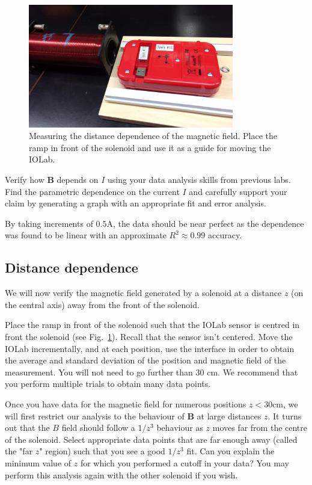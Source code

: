 \documentclass[12pt]{report}
\begin{document}
\begin{figure}[h]
\centering
\includegraphics[width=0.8\textwidth]{lab3-sessiona-ramp}
\caption{Measuring the distance dependence of the magnetic field. Place the ramp in front of the solenoid and use it as a guide for moving the IOLab.}
\label{Fig:lab3-sessiona-ramp}
\end{figure}

{\color{blue}Verify how $\mathbf{B}$ depends on $I$ using your data analysis skills from previous labs. Find the parametric dependence on the current $I$ and carefully support your claim by generating a graph with an appropriate fit and error analysis. }

\begin{tcolorbox}
By taking increments of $0.5$A, the data should be near perfect as the dependence was found to be linear with an approximate $R^2 \approx 0.99$ accuracy.
\end{tcolorbox}

\subsection{Distance dependence}
We will now verify the magnetic field generated by a solenoid at a distance $z$ (on the central axis) away from the front of the solenoid.

Place the ramp in front of the solenoid such that the IOLab sensor is centred in front the solenoid (see Fig.~\ref{Fig:lab3-sessiona-ramp}). 
Recall that the sensor isn't centered. Move the IOLab incrementally, and {\color{blue}at each position, use the interface in order to obtain the average and standard deviation of the position and magnetic field of the measurement. }
You will not need to go further than 30 cm. We recommend that you perform multiple trials to obtain many data points.

Once you have data for the magnetic field for numerous positions $z<30$cm, we will first restrict our analysis to the behaviour of $\mathbf{B}$ at large distances $z$. It turns out that the $B$ field should follow a $1/z^3$ behaviour as $z$ moves far from the centre of the solenoid. 
{\color{blue}Select appropriate data points that are far enough away (called the "far $z$" region) such that you see a good $1/z^3$ fit. Can you explain the minimum value of $z$ for which you performed a cutoff in your data?} You may perform this analysis again with the other solenoid if you wish.
\end{document}
